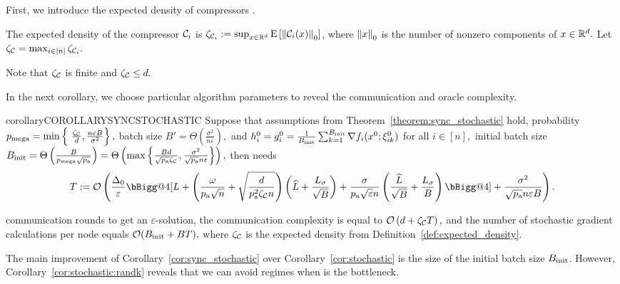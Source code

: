 \documentclass{article}
\makeatletter
\newcommand{\algorithmname}{DARIA}
\newcommand*{\probavailable}{\ensuremath{p_{\textnormal{a}}}}
\newcommand*{\probmega}{\ensuremath{p_{\text{mega}}}}
\newcommand{\vast}{\bBigg@{4}}
\makeatother
\begin{document}
  First, we introduce the expected density of compressors \citep{MARINA,tyurin2022dasha}.

  \begin{definition}
    \label{def:expected_density}
    The expected density of the compressor $\mathcal{C}_i$ is $\zeta_{\mathcal{C}_i} := \sup_{x \in \mathbb{R}^d} {\rm E}\left[\left\| \mathcal{C}_i(x) \right\|_0\right]$, where $\left\| x \right\|_0$ is the number of nonzero components of $x \in \mathbb{R}^d.$ Let  $\zeta_{\mathcal{C}} = \max_{i \in [n]} \zeta_{\mathcal{C}_i}.$
  \end{definition}

  Note that $\zeta_{\mathcal{C}}$ is finite and $\zeta_{\mathcal{C}} \leq d.$

  In the next corollary, we choose particular algorithm parameters to reveal the communication and oracle complexity.

  \begin{restatable}{corollary}{COROLLARYSYNCSTOCHASTIC}
    \label{cor:sync_stochastic}
    Suppose that assumptions from Theorem~\ref{theorem:sync_stochastic} hold, probability $\probmega = \min \left\{\ \frac{\zeta_{\cC}}{d}, \frac{n \varepsilon B}{\sigma^2}\right\},$ batch size 
    $B' = \Theta\left(\frac{\sigma^2}{n \varepsilon}\right),$
    and $h^{0}_i = g^{0}_i = \frac{1}{B_{\textnormal{init}}} \sum_{k = 1}^{B_{\textnormal{init}}} \nabla f_i(x^0; \xi^0_{ik})$ for all $i \in [n],$ initial batch size 
    $B_{\textnormal{init}} = \Theta\left(\frac{B}{\probmega \sqrt{\probavailable}}\right) = \Theta\left(\max \left\{\frac{B d}{ \sqrt{\probavailable} \zeta_{\cC}},  \frac{\sigma^2}{\sqrt{\probavailable} n \varepsilon} \right\}\right),$ 
    then \algname{\algorithmname-SYNC-MVR}
    needs
    $$T \eqdef \cO\left(\frac{\Delta_0}{\varepsilon}\vast[L + \left(\frac{\omega}{\probavailable\sqrt{n}} + \sqrt{\frac{d}{\probavailable^2 \zeta_{\cC} n}}\right) \left(\widehat{L} + \frac{L_{\sigma}}{\sqrt{B}}\right)  + \frac{\sigma}{\probavailable \sqrt{\varepsilon} n} \left(\frac{\widehat{L}}{\sqrt{B}} + \frac{L_{\sigma}}{B}\right)\vast] + \frac{\sigma^2}{\sqrt{\probavailable} n \varepsilon B}\right).$$
  
    communication rounds to get an $\varepsilon$-solution, the communication complexity is equal to $\mathcal{O}\left(d + \zeta_{\mathcal{C}} T\right),$ and the number of stochastic gradient calculations per node equals $\mathcal{O}(B_{\textnormal{init}} + BT),$ where $\zeta_{\mathcal{C}}$ is the expected density from Definition~\ref{def:expected_density}.
  \end{restatable}

  The main improvement of Corollary~\ref{cor:sync_stochastic} over Corollary~\ref{cor:stochastic} is the size of the initial batch size $B_{\textnormal{init}}$. However, Corollary~\ref{cor:stochastic:randk} reveals that we can avoid regimes when \algname{\algorithmname-MVR} is the bottleneck.
\end{document}
